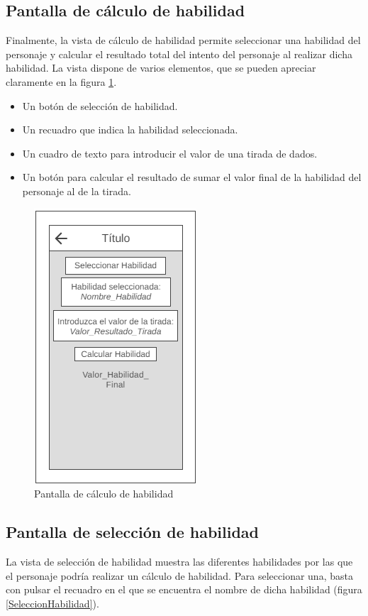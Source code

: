 \subsection{Pantalla de cálculo de habilidad}
Finalmente, la vista de cálculo de habilidad permite seleccionar una habilidad del personaje y 
calcular el resultado total del intento del personaje al realizar dicha habilidad. La vista dispone de varios elementos, 
que se pueden apreciar claramente en la figura \ref*{CalculoHabilidad}.
\begin{itemize}
    \item Un botón de selección de habilidad.
    \item Un recuadro que indica la habilidad seleccionada.
    \item Un cuadro de texto para introducir el valor de una tirada de dados.
    \item Un botón para calcular el resultado de sumar el valor final de la habilidad del personaje al de la tirada.
\end{itemize}

\begin{figure}[H]
    \centering
    \includegraphics[scale=0.3]{Figures/Mockups/Mock_CalcularHabilidad.png}
    \caption{Pantalla de cálculo de habilidad}
    \label{CalculoHabilidad}    
\end{figure}

\subsection{Pantalla de selección de habilidad}
La vista de selección de habilidad muestra las diferentes habilidades por las que el personaje podría 
realizar un cálculo de habilidad. Para seleccionar una, basta con pulsar el recuadro en el que se encuentra 
el nombre de dicha habilidad (figura \ref*{SeleccionHabilidad}).

